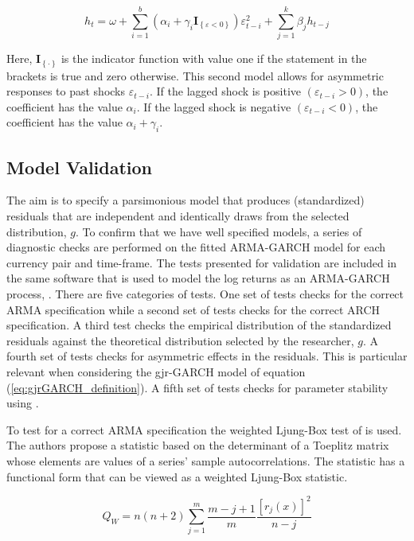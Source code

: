 \documentclass[12pt]{article}
\begin{document}
\begin{equation} \label{eq:gjrGARCH_definition}
	h_{t} = \omega + \sum_{i = 1}^{b}\left(\alpha_{i} + \gamma_{i}\mathbf{I}_{\left\{\varepsilon < 0 \right\}}\right) \varepsilon_{t - i}^{2} + \sum_{j = 1}^{k}\beta_{j}h_{t- j}
\end{equation}

Here, $\mathbf{I}_{\left\{ \cdot \right\}}$ is the indicator function with value one if the statement in the brackets is true and zero otherwise. This second model allows for asymmetric responses to past shocks $\varepsilon_{t-i}$. If the lagged shock is positive $\left(\varepsilon_{t-i}>0\right)$, the coefficient has the value $\alpha_{i}$. If the lagged shock is negative $\left(\varepsilon_{t-i} < 0 \right)$, the coefficient has the value $\alpha_{i} + \gamma_{i}$.

\subsection{Model Validation}

The aim is to specify a parsimonious model that produces (standardized) residuals that are independent and identically draws from the selected distribution, $g$. To confirm that we have well specified models, a series of diagnostic checks are performed on the fitted ARMA-GARCH model for each currency pair and time-frame. The tests presented for validation are included in the same software that is used to model the log returns as an ARMA-GARCH process, \cite{Rugarch}. There are five categories of tests. One set of tests checks for the correct ARMA specification while a second set of tests checks for the correct ARCH specification. A third test checks the empirical distribution of the standardized residuals against the theoretical distribution selected by the researcher, $g$. A fourth set of tests checks for asymmetric effects in the residuals. This is particular relevant when considering the gjr-GARCH model of equation (\ref{eq:gjrGARCH_definition}). A fifth set of tests checks for parameter stability using \cite{NYBLOM_1989}. 

To test for a correct ARMA specification the weighted Ljung-Box test of \cite{Fisher_Gallagher_2012} is used. The authors propose a statistic based on the determinant of a Toeplitz matrix whose elements are values of a series' sample autocorrelations. The statistic has a functional form that can be viewed as a weighted Ljung-Box statistic.

\begin{equation} \label{eq:wtd_ljung_box_arma_test}
	Q_{W} = n(n + 2) \sum_{j=1}^{m} \frac{m - j + 1}{m} \frac{[r_{j}(x)]^{2}}{n - j}
\end{equation}
\end{document}
